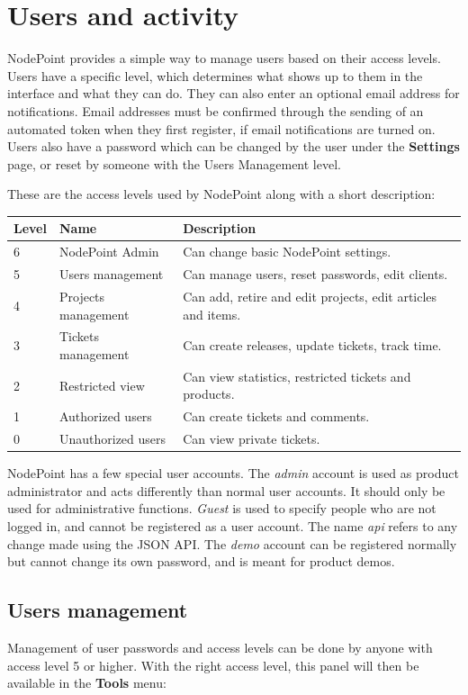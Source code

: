 \documentclass[11pt]{article}
\begin{document}
\clearpage

\section{Users and activity}
NodePoint provides a simple way to manage users based on their access levels. Users have a specific level, which determines what shows up to them in the interface and what they can do. They can also enter an optional email address for notifications. Email addresses must be confirmed through the sending of an automated token when they first register, if email notifications are turned on. Users also have a password which can be changed by the user under the \textbf{Settings} page, or reset by someone with the Users Management level.

These are the access levels used by NodePoint along with a short description:

\def\arraystretch{1.3} 
\begin{tabular}{ |p{15mm}|p{50mm}|p{100mm}| } 
\hline
\textbf{Level} & \textbf{Name} & \textbf{Description}\\
\hline
6 & NodePoint Admin & Can change basic NodePoint settings.\\
5 & Users management & Can manage users, reset passwords, edit clients.\\
4 & Projects management & Can add, retire and edit projects, edit articles and items.\\
3 & Tickets management & Can create releases, update tickets, track time.\\
2 & Restricted view & Can view statistics, restricted tickets and products.\\
1 & Authorized users & Can create tickets and comments.\\
0 & Unauthorized users & Can view private tickets.\\
\hline
\end{tabular}

NodePoint has a few special user accounts. The \textit{admin} account is used as product administrator and acts differently than normal user accounts. It should only be used for administrative functions. \textit{Guest} is used to specify people who are not logged in, and cannot be registered as a user account. The name \textit{api} refers to any change made using the JSON API. The \textit{demo} account can be registered normally but cannot change its own password, and is meant for product demos.

\subsection{Users management}
Management of user passwords and access levels can be done by anyone with access level 5 or higher. With the right access level, this panel will then be available in the \textbf{Tools} menu:
\end{document}
